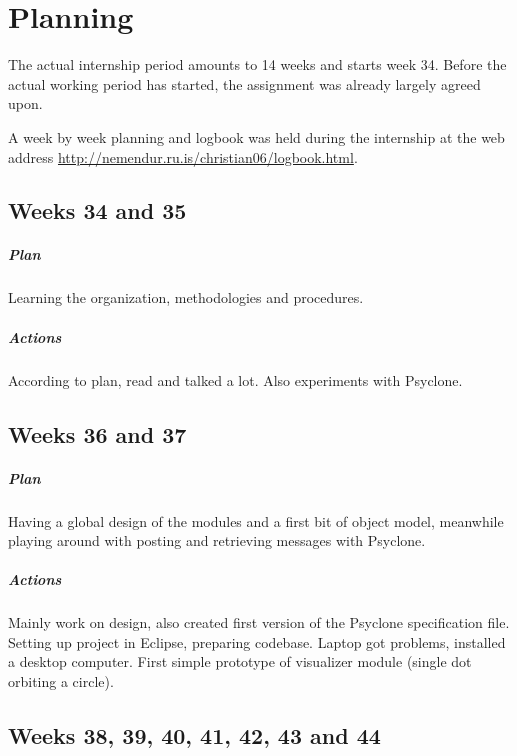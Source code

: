 \chapter{\label{cpt:planning}Planning}

The actual internship period amounts to 14 weeks and starts week 34. Before the
actual working period has started, the assignment was already largely agreed
upon.

A week by week planning and logbook was held during the internship at the web
address \url{http://nemendur.ru.is/christian06/logbook.html}.

\section{Weeks 34 and 35}

\paragraph{Plan} Learning the organization, methodologies and procedures.

\paragraph{Actions} According to plan, read and talked a lot. Also experiments
with Psyclone.

\section{Weeks 36 and 37}

\paragraph{Plan} Having a global design of the modules and a first bit of
object model, meanwhile playing around with posting and retrieving messages
with Psyclone.

\paragraph{Actions} Mainly work on design, also created first version of the
Psyclone specification file. Setting up project in Eclipse, preparing codebase.
Laptop got problems, installed a desktop computer. First simple prototype of
visualizer module (single dot orbiting a circle).

\section{Weeks 38, 39, 40, 41, 42, 43 and 44}

